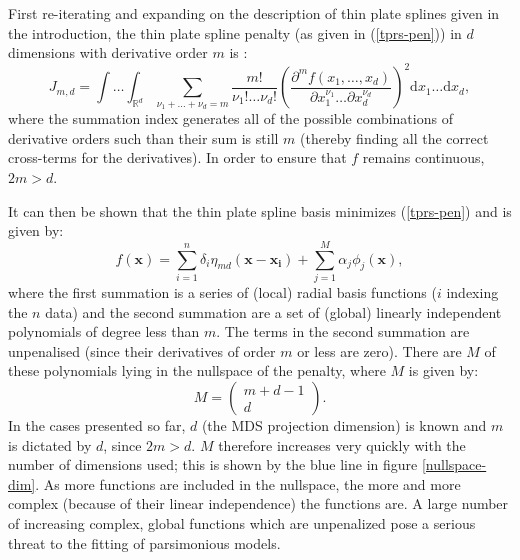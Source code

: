 First re-iterating and expanding on the description of thin plate splines given in the introduction, the thin plate spline penalty (as given in (\ref{tprs-pen})) in $d$ dimensions with derivative order $m$ is :
\begin{equation*}
J_{m,d} = \int \ldots \int_{\mathbb{R}^d} \sum_{\nu_1 + \dots + \nu_d=m} \frac{m!}{\nu_1! \dots \nu_d!} \left( \frac{\partial^m f \left (x_1,\dots,x_d \right )}{\partial x_1^{\nu_1} \ldots  \partial x_d^{\nu_d}} \right)^2 \text{d} x_1 \ldots  \text{d} x_d,
\end{equation*}
where the summation index generates all of the possible combinations of derivative orders such than their sum is still $m$ (thereby finding all the correct cross-terms for the derivatives). In order to ensure that $f$ remains continuous, $2m>d$.

It can then be shown that the thin plate spline basis minimizes (\ref{tprs-pen}) and is given by:
\begin{equation}
f(\mathbf{x}) = \sum_{i=1}^n \delta_i \eta_{md}(\mathbf{x}-\mathbf{x_i}) + \sum_{j=1}^M \alpha_j \phi_j(\mathbf{x}),
\end{equation}
where the first summation is a series of (local) radial basis functions ($i$ indexing the $n$ data) and the second summation are a set of (global) linearly independent polynomials of degree less than $m$. The terms in the second summation are unpenalised (since their derivatives of order $m$ or less are zero).  There are $M$ of these polynomials lying in the nullspace of the penalty, where $M$ is given by:
\begin{equation*}
M=\begin{pmatrix} m+d-1 \\ d  \end{pmatrix}.
\end{equation*}
In the cases presented so far, $d$ (the MDS projection dimension) is known and $m$ is dictated by $d$, since $2m>d$. $M$ therefore increases very quickly with the number of dimensions used; this is shown by the blue line in figure \ref{nullspace-dim}. As more functions are included in the nullspace, the more and more complex (because of their linear independence) the functions are. A large number of increasing complex, global functions which are unpenalized pose a serious threat to the fitting of parsimonious models.


